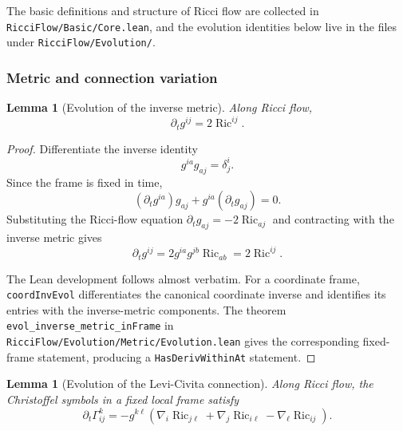 \documentclass[11pt]{article}
\theoremstyle{plain}
\newtheorem{lemma}[theorem]{Lemma}
\theoremstyle{definition}
\theoremstyle{remark}
\newcommand{\Ric}{\operatorname{Ric}}
\newcommand{\leanref}[1]{\nolinkurl{#1}}
\newcommand{\leanfile}[1]{\nolinkurl{#1}}
\newcommand{\rffile}[1]{\leanfile{#1}}
\newcommand{\rfdir}[1]{\leanfile{#1/}}
\begin{document}
The basic definitions and structure of Ricci flow are collected in
\rffile{RicciFlow/Basic/Core.lean}, and the evolution identities below live in
the files under \rfdir{RicciFlow/Evolution}.

\subsubsection{Metric and connection variation}

\begin{lemma}[Evolution of the inverse metric]
\label{lem:evol-inverse-metric}
Along Ricci flow,
\[
  \partial_t g^{ij}=2\Ric^{ij}.
\]
\end{lemma}

\begin{proof}
Differentiate the inverse identity
\[
  g^{ia}g_{aj}=\delta^i_j.
\]
Since the frame is fixed in time,
\[
  (\partial_t g^{ia})g_{aj}
  +g^{ia}(\partial_t g_{aj})=0.
\]
Substituting the Ricci-flow equation \(\partial_tg_{aj}=-2\Ric_{aj}\) and
contracting with the inverse metric gives
\[
  \partial_tg^{ij}
  =
  2g^{ia}g^{jb}\Ric_{ab}
  =
  2\Ric^{ij}.
\]

The Lean development follows almost verbatim.  For a coordinate frame,
\leanref{coordInvEvol} differentiates the canonical coordinate inverse and
identifies its entries with the inverse-metric components.  The theorem
\leanref{evol_inverse_metric_inFrame} in
\rffile{RicciFlow/Evolution/Metric/Evolution.lean} gives the corresponding
fixed-frame statement, producing a \texttt{HasDerivWithinAt} statement.
\end{proof}

\begin{lemma}[Evolution of the Levi-Civita connection]
\label{lem:evol-christoffel}
Along Ricci flow, the Christoffel symbols in a fixed local frame satisfy
\[
  \partial_t\Gamma^k_{ij}
  =
  -g^{k\ell}
  \left(
    \nabla_i\Ric_{j\ell}
    +
    \nabla_j\Ric_{i\ell}
    -
    \nabla_\ell\Ric_{ij}
  \right).
\]
\end{lemma}
\end{document}
